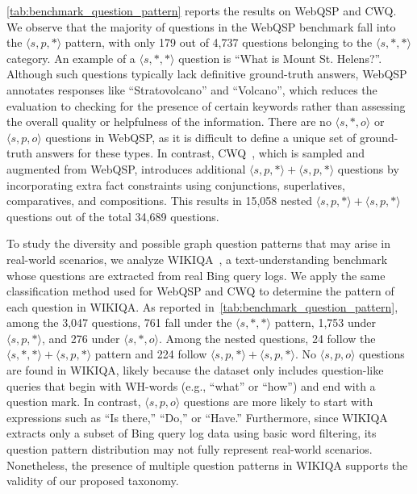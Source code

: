 \autoref{tab:benchmark_question_pattern} reports the results on WebQSP and CWQ. We observe that the majority of questions in the WebQSP benchmark fall into the $\langle s,p,*\rangle$ pattern, with only 179 out of 4,737 questions belonging to the $\langle s,*,* \rangle$ category. An example of a $\langle s,*,* \rangle$ question is “What is Mount St. Helens?”. Although such questions typically lack definitive ground-truth answers, WebQSP annotates responses like “Stratovolcano” and “Volcano”, which reduces the evaluation to checking for the presence of certain keywords rather than assessing the overall quality or helpfulness of the information. There are no $\langle s,*,o \rangle$ or $\langle s,p,o \rangle$ questions in WebQSP, as it is difficult to define a unique set of ground-truth answers for these types. In contrast, CWQ~\cite{cwq}, which is sampled and augmented from WebQSP, introduces additional $\langle s,p,* \rangle + \langle s,p,* \rangle$ questions by incorporating extra fact constraints using conjunctions, superlatives, comparatives, and compositions. This results in 15,058 nested $\langle s,p,* \rangle + \langle s,p,* \rangle$ questions out of the total 34,689 questions.


To study the diversity and possible graph question patterns that may arise in real-world scenarios, we analyze WIKIQA~\cite{wikiqa}, a text-understanding benchmark whose questions are extracted from real Bing query logs. We apply the same classification method used for WebQSP and CWQ to determine the pattern of each question in WIKIQA. As reported in~\autoref{tab:benchmark_question_pattern}, among the 3,047 questions, 761 fall under the $\langle s,*,* \rangle$ pattern, 1,753 under $\langle s,p,* \rangle$, and 276 under $\langle s,*,o \rangle$. Among the nested questions, 24 follow the $\langle s,*,* \rangle + \langle s,p,* \rangle$ pattern and 224 follow $\langle s,p,* \rangle + \langle s,p,* \rangle$. No $\langle s,p,o \rangle$ questions are found in WIKIQA, likely because the dataset only includes question-like queries that begin with WH-words (e.g., “what” or “how”) and end with a question mark. In contrast, $\langle s,p,o \rangle$ questions are more likely to start with expressions such as “Is there,” “Do,” or “Have.” Furthermore, since WIKIQA extracts only a subset of Bing query log data using basic word filtering, its question pattern distribution may not fully represent real-world scenarios. Nonetheless, the presence of multiple question patterns in WIKIQA supports the validity of our proposed taxonomy.


